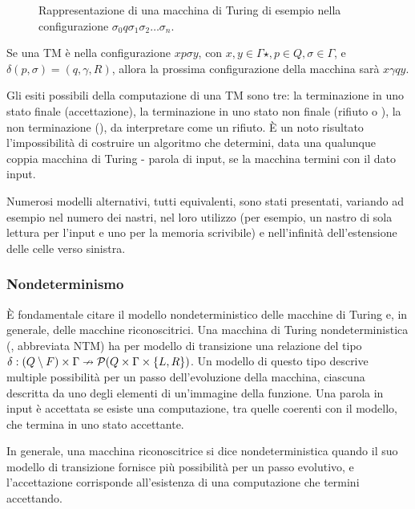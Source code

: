 \begin{figure}
	\centering
	
	\caption{Rappresentazione di una macchina di Turing di esempio nella configurazione $\sigma_0 q \sigma_1\sigma_2\dots\sigma_n$.}
\end{figure}

\begin{examp}
	Se una TM è nella configurazione $xp\sigma y$, con $x,y\in\Gamma\star, p\in Q,\sigma\in\Gamma$, e $\delta(p,\sigma)=(q,\gamma,R)$, allora la prossima configurazione della macchina sarà $x\gamma qy$.
\end{examp}

Gli esiti possibili della computazione di una TM sono tre: la terminazione in uno stato finale (accettazione), la terminazione in uno stato non finale (rifiuto o ), la non terminazione (), da interpretare come un rifiuto. È un noto risultato l'impossibilità di costruire un algoritmo che determini, data una qualunque coppia macchina di Turing - parola di input, se la macchina termini con il dato input.

Numerosi modelli alternativi, tutti equivalenti, sono stati presentati, variando ad esempio nel numero dei nastri, nel loro utilizzo (per esempio, un nastro di sola lettura per l'input e uno per la memoria scrivibile) e nell'infinità dell'estensione delle celle verso sinistra.

\subsubsection{Nondeterminismo}
È fondamentale citare il modello nondeterministico delle macchine di Turing e, in generale, delle macchine riconoscitrici. Una macchina di Turing nondeterministica (, abbreviata NTM) ha per modello di transizione una relazione del tipo $\delta:(Q\setminus F)\times\Gamma\nrightarrow \mathcal P(Q\times\Gamma\times\left\{ L,R \right\})$. Un modello di questo tipo descrive multiple possibilità per un passo dell'evoluzione della macchina, ciascuna descritta da uno degli elementi di un'immagine della funzione. Una parola in input è accettata se esiste una computazione, tra quelle coerenti con il modello, che termina in uno stato accettante.

In generale, una macchina riconoscitrice si dice nondeterministica quando il suo modello di transizione fornisce più possibilità per un passo evolutivo, e l'accettazione corrisponde all'esistenza di una computazione che termini accettando.

